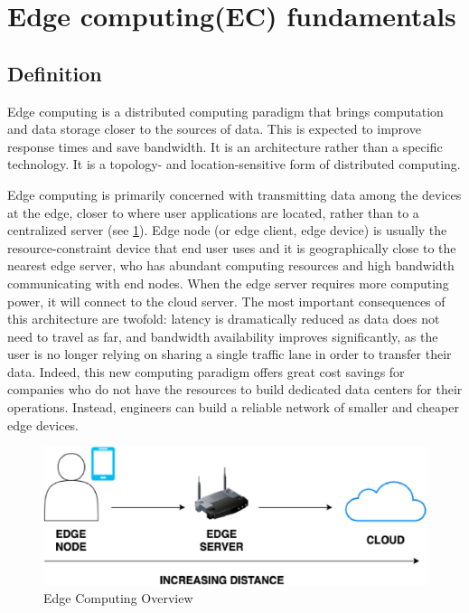 

\section{Edge computing(EC) fundamentals} \label{4ecomfun}

\subsection{Definition}
Edge computing is a distributed computing paradigm that brings computation and data storage closer to the sources of data. This is expected to improve response times and save bandwidth. It is an architecture rather than a specific technology. It is a topology- and location-sensitive form of distributed computing.

Edge computing is primarily concerned with transmitting data among the devices at the edge, closer to where user applications are located, rather than to a centralized server (see \ref{fig:ec_fundamentals}). Edge node (or edge client, edge device) is usually the resource-constraint device that end user uses and it is geographically close to the nearest edge server, who has abundant computing resources and high bandwidth communicating with end nodes. When the edge server requires more computing power, it will connect to the cloud server. The most important consequences of this architecture are twofold: latency is dramatically reduced as data does not need to travel as far, and bandwidth availability improves significantly, as the user is no longer relying on sharing a single traffic lane in order to transfer their data. Indeed, this new computing paradigm offers great cost savings for companies who do not have the resources to build dedicated data centers for their operations. Instead, engineers can build a reliable network of smaller and cheaper edge devices. \cite{fedrated_learning_as_edge_computing}


\begin{figure}[H]
\centering
\includegraphics[scale=0.6]{img/edge_computing_main_pic.jpg}
\caption{Edge Computing Overview}
\label{fig:ec_fundamentals}
\end{figure}


